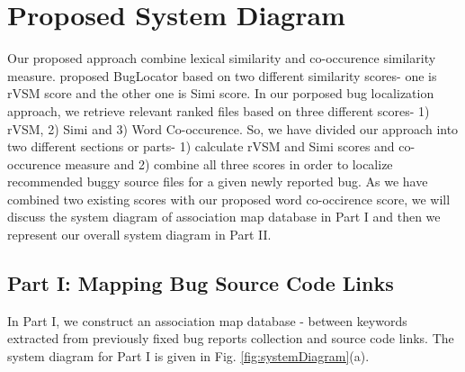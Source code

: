 \documentclass[conference]{IEEEtran}
\begin{document}
\section{Proposed System Diagram}\label{sec:proposedsystemDiagram}
Our proposed approach combine lexical similarity and co-occurence similarity measure.  \citet{Jian} proposed BugLocator based on two different similarity scores- one is rVSM score and the other one is Simi score. In our porposed bug localization approach, we retrieve relevant ranked files based on three different scores- 1) rVSM, 2) Simi and 3) Word Co-occurence. So,
we have divided our approach into two different sections or parts- 1) calculate rVSM and Simi scores and co-occurence measure and 2) combine all three scores in order to localize recommended buggy source files for a given newly reported bug. As we have combined two existing scores with our proposed word co-occirence score, we will discuss the system diagram of association map database in Part I and then we represent our overall system diagram in Part II.

\subsection{Part I: Mapping Bug Source Code Links}
In Part I, we construct an association map database - between keywords extracted from previously fixed bug reports collection and source code links. The system diagram for Part I is given in Fig. \ref{fig:systemDiagram}(a).
\end{document}
